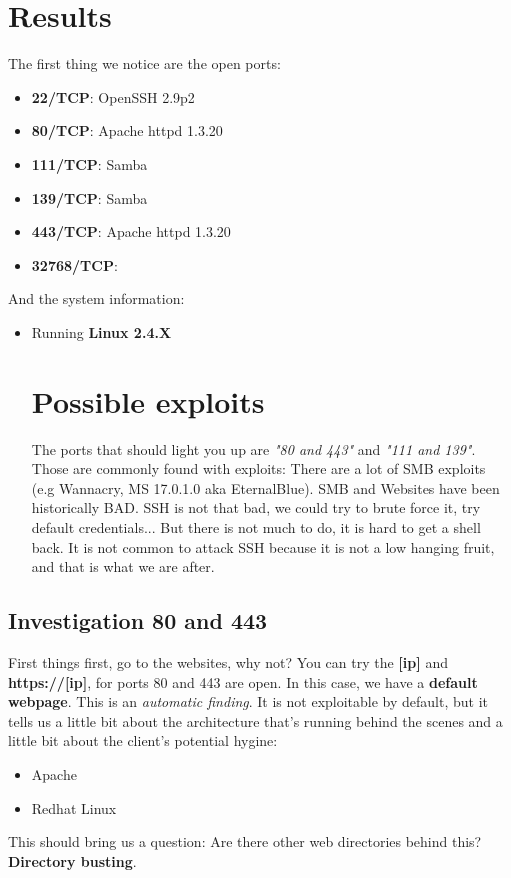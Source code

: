 \documentclass[11pt,a4paper]{article}
\begin{document}
\section{Results}
The first thing we notice are the open ports:
\begin{itemize}
\item \textbf{22/TCP}: OpenSSH 2.9p2
\item \textbf{80/TCP}: Apache httpd 1.3.20
\item \textbf{111/TCP}: Samba
\item \textbf{139/TCP}: Samba
\item \textbf{443/TCP}: Apache httpd 1.3.20
\item \textbf{32768/TCP}: 
\end{itemize}
And the system information:
\begin{itemize}
\item Running \textbf{Linux 2.4.X}

\section{Possible exploits}
The ports that should light you up are \textit{"80 and 443"} and \textit{"111 and 139"}. Those are commonly found with exploits: There are a lot of SMB exploits (e.g Wannacry, MS 17.0.1.0 aka EternalBlue). SMB and Websites have been historically BAD. SSH is not that bad, we could try to brute force it, try default credentials... But there is not much to do, it is hard to get a shell back. It is not common to attack SSH because it is not a low hanging fruit, and that is what we are after.
\end{itemize}

\subsection{Investigation 80 and 443}
First things first, go to the websites, why not? You can try the \textbf{[ip]} and \textbf{https://[ip]}, for ports 80 and 443 are open. In this case, we have a \textbf{default webpage}. This is an \textit{automatic finding}. It is not exploitable by default, but it tells us a little bit about the architecture that's running behind the scenes and a little bit about the client's potential hygine:
\begin{multicols}{2}
\begin{itemize}
\item Apache
\item Redhat Linux
\end{itemize}
\end{multicols}
This should bring us a question: Are there other web directories behind this? \textbf{Directory busting}.\\
\end{document}
